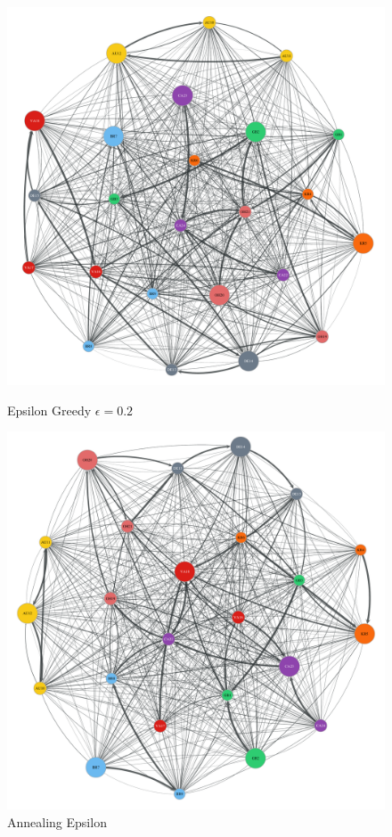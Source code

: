 \begin{figure}[t]
    \centering
      \includegraphics[width=\linewidth]{figures/b-epsilon-greedy-0-2-e3}
      \caption{Epsilon Greedy $\epsilon=0.2$}\label{fig:epsilon_greedy_e2}
  \endminipage\hfill
    \includegraphics[width=\linewidth]{figures/b-annealing-epsilon-greedy-e5}
    \caption{Annealing Epsilon}\label{fig:annealing_epsilon}
  \endminipage
\end{figure}


